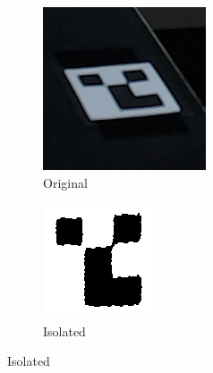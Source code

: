 
\begin{figure}[!ht]
	\centering
	\begin{subfigure}{.24\textwidth}
		\centering
		\includegraphics[width=0.8\linewidth]{figures/fiducial-step1}
		\caption{Original}
		\label{fig:fiducial-step1}
	\end{subfigure}%
	\begin{subfigure}{.24\textwidth}
		\centering
		\includegraphics[width=0.8\linewidth]{figures/fiducial-step2}
		\caption{Isolated}
		\label{fig:fiducial-step2}
	\end{subfigure}

\end{figure}
